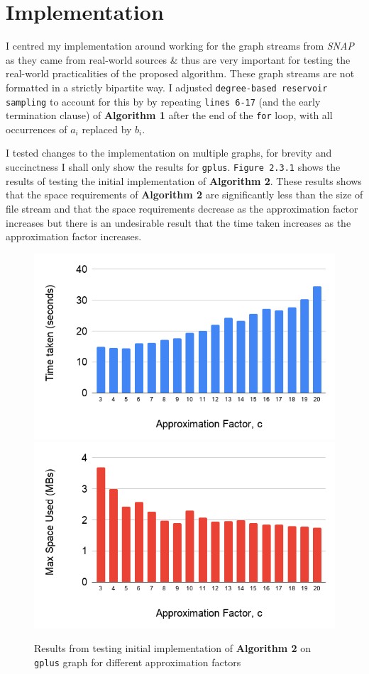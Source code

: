 \documentclass[11pt,twoside,a4paper]{report}
\begin{document}
\section{Implementation}
\par I centred my implementation around working for the graph streams from \textit{SNAP} \cite{SNAP} as they came from real-world sources \& thus are very important for testing the real-world practicalities of the proposed algorithm. These graph streams are not formatted in a strictly bipartite way. I adjusted \texttt{degree-based reservoir sampling} to account for this by by repeating \texttt{lines 6-17} (and the early termination clause) of \textbf{Algorithm 1} after the end of the \texttt{for} loop, with all occurrences of $a_i$ replaced by $b_i$.
\par I tested changes to the implementation on multiple graphs, for brevity and succinctness I shall only show the results for \texttt{gplus}. \texttt{Figure 2.3.1} shows the results of testing the initial implementation of \textbf{Algorithm 2}. These results shows that the space requirements of \textbf{Algorithm 2} are significantly less than the size of file stream and that the space requirements decrease as the approximation factor increases but there is an undesirable result that the time taken increases as the approximation factor increases.
\begin{figure}[H]
	\label{Figure 2}
	\includegraphics[width=.5\textwidth]{img/gplusInitialTime.png}
	\includegraphics[width=.5\textwidth]{img/gplusInitialSpace.png}
	\caption{Results from testing initial implementation of \textbf{Algorithm 2} on \texttt{gplus} graph for different approximation factors}
\end{figure}
\end{document}
